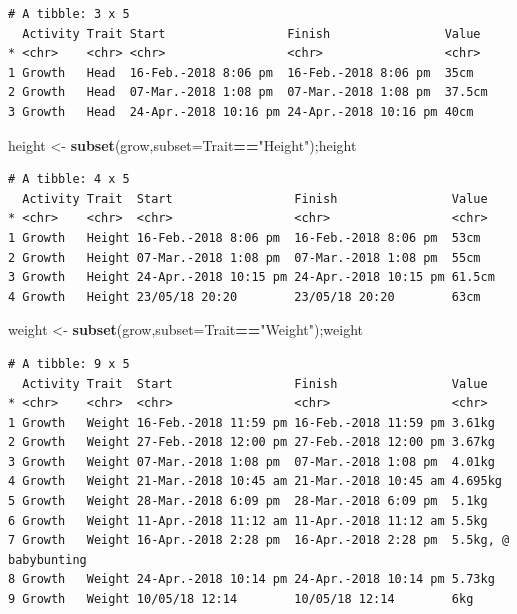 \documentclass[10,portrait]{article}
\newenvironment{Shaded}{\begin{snugshade}}{\end{snugshade}}
\newcommand{\KeywordTok}[1]{\textcolor[rgb]{0.13,0.29,0.53}{\textbf{#1}}}
\newcommand{\DataTypeTok}[1]{\textcolor[rgb]{0.13,0.29,0.53}{#1}}
\newcommand{\StringTok}[1]{\textcolor[rgb]{0.31,0.60,0.02}{#1}}
\newcommand{\OperatorTok}[1]{\textcolor[rgb]{0.81,0.36,0.00}{\textbf{#1}}}
\newcommand{\NormalTok}[1]{#1}
\begin{document}
\begin{verbatim}
# A tibble: 3 x 5
  Activity Trait Start                 Finish                Value 
* <chr>    <chr> <chr>                 <chr>                 <chr> 
1 Growth   Head  16-Feb.-2018 8:06 pm  16-Feb.-2018 8:06 pm  35cm  
2 Growth   Head  07-Mar.-2018 1:08 pm  07-Mar.-2018 1:08 pm  37.5cm
3 Growth   Head  24-Apr.-2018 10:16 pm 24-Apr.-2018 10:16 pm 40cm  
\end{verbatim}

\begin{Shaded}
\begin{Highlighting}[]
\NormalTok{height <-}\StringTok{ }\KeywordTok{subset}\NormalTok{(grow,}\DataTypeTok{subset=}\NormalTok{Trait}\OperatorTok{==}\StringTok{"Height"}\NormalTok{);height}
\end{Highlighting}
\end{Shaded}

\begin{verbatim}
# A tibble: 4 x 5
  Activity Trait  Start                 Finish                Value 
* <chr>    <chr>  <chr>                 <chr>                 <chr> 
1 Growth   Height 16-Feb.-2018 8:06 pm  16-Feb.-2018 8:06 pm  53cm  
2 Growth   Height 07-Mar.-2018 1:08 pm  07-Mar.-2018 1:08 pm  55cm  
3 Growth   Height 24-Apr.-2018 10:15 pm 24-Apr.-2018 10:15 pm 61.5cm
4 Growth   Height 23/05/18 20:20        23/05/18 20:20        63cm  
\end{verbatim}

\begin{Shaded}
\begin{Highlighting}[]
\NormalTok{weight <-}\StringTok{ }\KeywordTok{subset}\NormalTok{(grow,}\DataTypeTok{subset=}\NormalTok{Trait}\OperatorTok{==}\StringTok{"Weight"}\NormalTok{);weight  }
\end{Highlighting}
\end{Shaded}

\begin{verbatim}
# A tibble: 9 x 5
  Activity Trait  Start                 Finish                Value               
* <chr>    <chr>  <chr>                 <chr>                 <chr>               
1 Growth   Weight 16-Feb.-2018 11:59 pm 16-Feb.-2018 11:59 pm 3.61kg              
2 Growth   Weight 27-Feb.-2018 12:00 pm 27-Feb.-2018 12:00 pm 3.67kg              
3 Growth   Weight 07-Mar.-2018 1:08 pm  07-Mar.-2018 1:08 pm  4.01kg              
4 Growth   Weight 21-Mar.-2018 10:45 am 21-Mar.-2018 10:45 am 4.695kg             
5 Growth   Weight 28-Mar.-2018 6:09 pm  28-Mar.-2018 6:09 pm  5.1kg               
6 Growth   Weight 11-Apr.-2018 11:12 am 11-Apr.-2018 11:12 am 5.5kg               
7 Growth   Weight 16-Apr.-2018 2:28 pm  16-Apr.-2018 2:28 pm  5.5kg, @ babybunting
8 Growth   Weight 24-Apr.-2018 10:14 pm 24-Apr.-2018 10:14 pm 5.73kg              
9 Growth   Weight 10/05/18 12:14        10/05/18 12:14        6kg                 
\end{verbatim}
\end{document}
